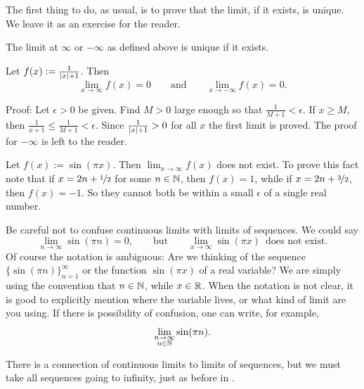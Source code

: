 The first thing to do, as usual, is to prove that the limit, if it exists,
is unique.
We leave it as an exercise for the reader.

\begin{prop} \label{liminfty:unique}
The limit at $\infty$ or $-\infty$ as defined above is unique if it exists.
\end{prop}

\begin{example}
Let $f(x) := \frac{1}{\left\lvert {x} \right\rvert+1}$.  Then
\begin{equation*}
\lim_{x\to \infty} f(x) = 0 \qquad \text{and} \qquad
\lim_{x\to -\infty} f(x) = 0 .
\end{equation*}

Proof:
Let $\epsilon > 0$ be given.  Find $M > 0$ large enough
so that $\frac{1}{M+1} < \epsilon$.  If
$x \geq M$, then $\frac{1}{x+1} \leq \frac{1}{M+1} < \epsilon$.
Since $\frac{1}{\left\lvert {x} \right\rvert+1} > 0$ for all $x$ the first limit is proved.
The proof for $-\infty$ is left to the reader.
\end{example}

\begin{example}
Let $f(x) := \sin(\pi x)$.  Then $\lim_{x\to\infty} f(x)$ does not exist.
To prove this fact note that if $x = 2n+\nicefrac{1}{2}$ for some $n \in
{\mathbb{N}}$, then $f(x)=1$,
while if $x = 2n+\nicefrac{3}{2}$, then $f(x)=-1$.  So they cannot both be
within a small $\epsilon$ of a single real number.

Be careful not to confuse continuous limits with limits of sequences.
We could say
\begin{equation*}
\lim_{n \to \infty} \sin(\pi n) = 0, \qquad \text{but} \qquad
\lim_{x \to \infty} \sin(\pi x) \enspace \text{does not exist}.
\end{equation*}
Of course the notation is ambiguous:  Are we thinking of the
sequence $\bigl\{ \sin (\pi n) \bigr\}_{n=1}^\infty$ or the function $\sin(\pi x)$
of a real variable?  We are simply using the convention
that $n \in {\mathbb{N}}$, while $x \in {\mathbb{R}}$.  When the notation is not clear,
it is good to explicitly mention where the variable lives, or what kind
of limit are you using.  If there is possibility of confusion, one can
write, for example,
\begin{equation*}
\lim_{\substack{n \to \infty\\n \in {\mathbb{N}}}} \sin(\pi n) .
\end{equation*}
\end{example}

There is a connection of continuous limits to limits of sequences, but we must take all
sequences going to infinity, just as before in .

